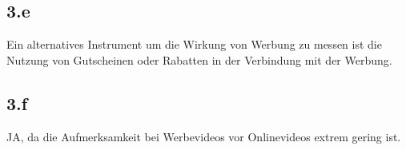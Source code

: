 \subsection{3.e}
    Ein alternatives Instrument um die Wirkung von Werbung zu messen ist die Nutzung von Gutscheinen oder Rabatten in der Verbindung mit der Werbung.

\subsection{3.f}
    JA, da die Aufmerksamkeit bei Werbevideos vor Onlinevideos extrem gering ist.